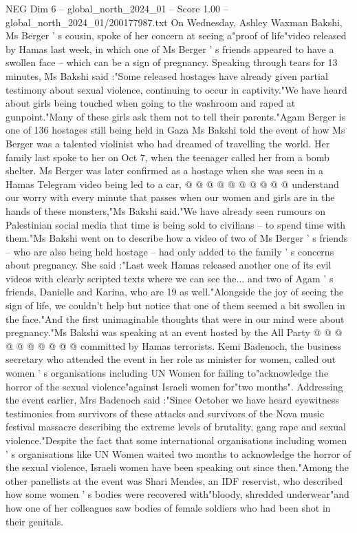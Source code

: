 \begin{textsample}{NEG Dim 6 – global\_north\_2024\_01 – Score 1.00 – global\_north\_2024\_01/200177987.txt}  \label{ex:f6_neg_331}
On Wednesday, Ashley Waxman Bakshi, Ms Berger ' s cousin, spoke of her concern at seeing a"proof of life"video released by Hamas last week, in which one of Ms Berger ' s friends appeared to have a swollen face -- which can be a sign of pregnancy.
Speaking through tears for 13 minutes, Ms Bakshi said :"Some released hostages have already given partial testimony about sexual violence, continuing to occur in captivity."We have heard about girls being touched when going to the washroom and raped at gunpoint."Many of these girls ask them not to tell their parents."Agam Berger is one of 136 hostages still being held in Gaza Ms Bakshi told the event of how Ms Berger was a talented violinist who had dreamed of travelling the world.
Her family last spoke to her on Oct 7, when the teenager called her from a bomb shelter.
Ms Berger was later confirmed as a hostage when she was seen in a Hamas Telegram video being led to a car, @ @ @ @ @ @ @ @ @ @ understand our worry with every minute that passes when our women and girls are in the hands of these monsters,"Ms Bakshi said."We have already seen rumours on Palestinian social media that time is being sold to civilians -- to spend time with them."Ms Bakshi went on to describe how a video of two of Ms Berger ' s friends -- who are also being held hostage -- had only added to the family ' s concerns about pregnancy.
She said :"Last week Hamas released another one of its evil videos with clearly scripted texts where we can see the... and two of Agam ' s friends, Danielle and Karina, who are 19 as well."Alongside the joy of seeing the sign of life, we couldn't help but notice that one of them seemed a bit swollen in the face."And the first unimaginable thoughts that were in our mind were about pregnancy."Ms Bakshi was speaking at an event hosted by the All Party @ @ @ @ @ @ @ @ @ @ committed by Hamas terrorists.
Kemi Badenoch, the business secretary who attended the event in her role as minister for women, called out women ' s organisations including UN Women for failing to"acknowledge the horror of the sexual violence"against Israeli women for"two months".
Addressing the event earlier, Mrs Badenoch said :"Since October we have heard eyewitness testimonies from survivors of these attacks and survivors of the Nova music festival massacre describing the extreme levels of brutality, gang rape and sexual violence."Despite the fact that some international organisations including women ' s organisations like UN Women waited two months to acknowledge the horror of the sexual violence, Israeli women have been speaking out since then."Among the other panellists at the event was Shari Mendes, an IDF reservist, who described how some women ' s bodies were recovered with"bloody, shredded underwear"and how one of her colleagues saw bodies of female soldiers who had been shot in their genitals.

\end{textsample}
